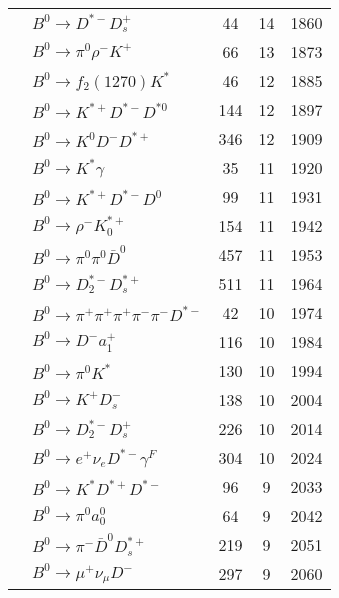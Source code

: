 \documentclass[landscape]{article}
\newcounter{rownumbers}
\newcommand\rn{\stepcounter{rownumbers}\arabic{rownumbers}}
\newcommand{\EOL}{\\} %
\newcommand{\topoTags}[1]{#1} %
\begin{document}
\begin{longtable}{clccc}
\rn & $ B^{0} \rightarrow D^{*-} D_{s}^{+} $ & \topoTags{44 & }14 & 1860 \EOL

\rn & $ B^{0} \rightarrow \pi^{0} \rho^{-} K^{+} $ & \topoTags{66 & }13 & 1873 \EOL

\rn & $ B^{0} \rightarrow f_{2}(1270) K^{*} $ & \topoTags{46 & }12 & 1885 \EOL

\rn & $ B^{0} \rightarrow K^{*+} D^{*-} D^{*0} $ & \topoTags{144 & }12 & 1897 \EOL

\rn & $ B^{0} \rightarrow K^{0} D^{-} D^{*+} $ & \topoTags{346 & }12 & 1909 \EOL

\rn & $ B^{0} \rightarrow K^{*} \gamma $ & \topoTags{35 & }11 & 1920 \EOL

\rn & $ B^{0} \rightarrow K^{*+} D^{*-} D^{0} $ & \topoTags{99 & }11 & 1931 \EOL

\rn & $ B^{0} \rightarrow \rho^{-} K_{0}^{*+} $ & \topoTags{154 & }11 & 1942 \EOL

\rn & $ B^{0} \rightarrow \pi^{0} \pi^{0} \bar{D}^{0} $ & \topoTags{457 & }11 & 1953 \EOL

\rn & $ B^{0} \rightarrow D_{2}^{*-} D_{s}^{*+} $ & \topoTags{511 & }11 & 1964 \EOL

\rn & $ B^{0} \rightarrow \pi^{+} \pi^{+} \pi^{+} \pi^{-} \pi^{-} D^{*-} $ & \topoTags{42 & }10 & 1974 \EOL

\rn & $ B^{0} \rightarrow D^{-} a_{1}^{+} $ & \topoTags{116 & }10 & 1984 \EOL

\rn & $ B^{0} \rightarrow \pi^{0} K^{*} $ & \topoTags{130 & }10 & 1994 \EOL

\rn & $ B^{0} \rightarrow K^{+} D_{s}^{-} $ & \topoTags{138 & }10 & 2004 \EOL

\rn & $ B^{0} \rightarrow D_{2}^{*-} D_{s}^{+} $ & \topoTags{226 & }10 & 2014 \EOL

\rn & $ B^{0} \rightarrow e^{+} \nu_{e} D^{*-} \gamma^{F} $ & \topoTags{304 & }10 & 2024 \EOL

\rn & $ B^{0} \rightarrow K^{*} D^{*+} D^{*-} $ & \topoTags{96 & }9 & 2033 \EOL

\rn & $ B^{0} \rightarrow \pi^{0} a_{0}^{0} $ & \topoTags{64 & }9 & 2042 \EOL

\rn & $ B^{0} \rightarrow \pi^{-} \bar{D}^{0} D_{s}^{*+} $ & \topoTags{219 & }9 & 2051 \EOL

\rn & $ B^{0} \rightarrow \mu^{+} \nu_{\mu} D^{-} $ & \topoTags{297 & }9 & 2060 \EOL


\end{longtable}
\end{document}
